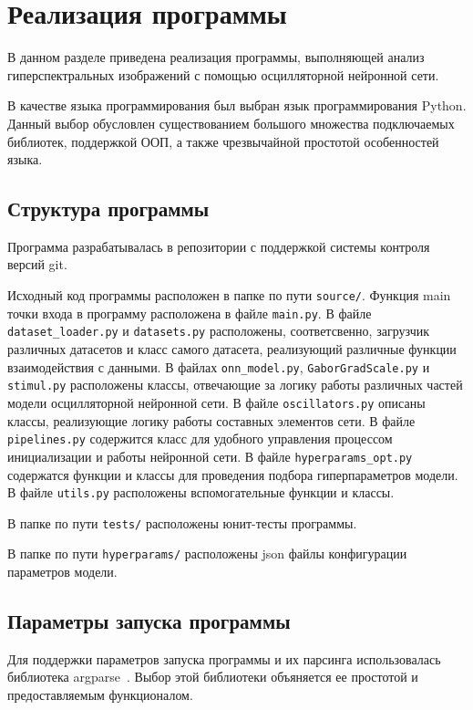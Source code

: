 \documentclass[14pt, russian]{scrartcl}
\begin{document}
\section{Реализация программы}

В данном разделе приведена реализация программы, выполняющей анализ гиперспектральных изображений с помощью осцилляторной нейронной сети.

В качестве языка программирования был выбран язык программирования Python. Данный выбор обусловлен существованием большого множества подключаемых библиотек,
поддержкой ООП, а также чрезвычайной простотой особенностей языка.

\subsection{Структура программы}

Программа разрабатывалась в репозитории с поддержкой системы контроля версий git.

Исходный код программы расположен в папке по пути \texttt{source/}. Функция main точки входа в программу расположена в файле \texttt{main.py}. В файле \texttt{dataset\_loader.py} 
и \texttt{datasets.py} расположены, соответсвенно, загрузчик различных датасетов и класс самого датасета, реализующий различные функции взаимодействия с данными.
В файлах \texttt{onn\_model.py}, \texttt{GaborGradScale.py} и \texttt{stimul.py} расположены классы, отвечающие за логику работы различных частей модели осцилляторной нейронной сети.
В файле \texttt{oscillators.py} описаны классы, реализующие логику работы составных элементов сети. В файле \texttt{pipelines.py} содержится класс для удобного управления процессом инициализации и работы нейронной сети.
В файле \texttt{hyperparams\_opt.py} содержатся функции и классы для проведения подбора гиперпараметров модели. В файле \texttt{utils.py} расположены вспомогательные функции и классы.

В папке по пути \texttt{tests/} расположены юнит-тесты программы.

В папке по пути \texttt{hyperparams/} расположены json файлы конфигурации параметров модели. 

\subsection{Параметры запуска программы}

Для поддержки параметров запуска программы и их парсинга использовалась библиотека argparse~\cite{1}. Выбор этой библиотеки объяняется ее простотой и предоставляемым функционалом.
\end{document}
